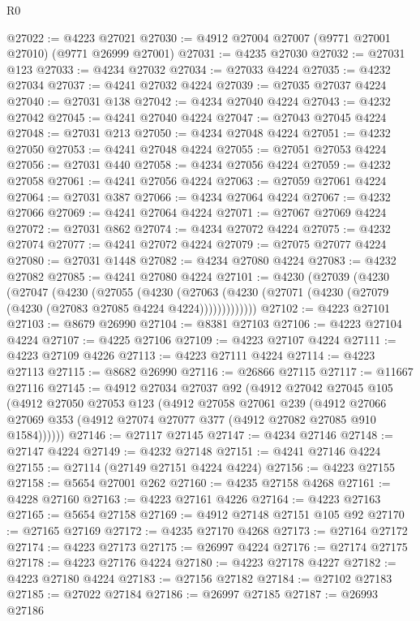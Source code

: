 \begin{lexlean}{R0}
\begin{coremodule}
@27022 := @4223 @27021
@27030 := @4912 @27004 @27007 (@9771 @27001 @27010) (@9771 @26999 @27001)
@27031 := @4235 @27030
@27032 := @27031 @123
@27033 := @4234 @27032
@27034 := @27033 @4224
@27035 := @4232 @27034
@27037 := @4241 @27032 @4224
@27039 := @27035 @27037 @4224
@27040 := @27031 @138
@27042 := @4234 @27040 @4224
@27043 := @4232 @27042
@27045 := @4241 @27040 @4224
@27047 := @27043 @27045 @4224
@27048 := @27031 @213
@27050 := @4234 @27048 @4224
@27051 := @4232 @27050
@27053 := @4241 @27048 @4224
@27055 := @27051 @27053 @4224
@27056 := @27031 @440
@27058 := @4234 @27056 @4224
@27059 := @4232 @27058
@27061 := @4241 @27056 @4224
@27063 := @27059 @27061 @4224
@27064 := @27031 @387
@27066 := @4234 @27064 @4224
@27067 := @4232 @27066
@27069 := @4241 @27064 @4224
@27071 := @27067 @27069 @4224
@27072 := @27031 @862
@27074 := @4234 @27072 @4224
@27075 := @4232 @27074
@27077 := @4241 @27072 @4224
@27079 := @27075 @27077 @4224
@27080 := @27031 @1448
@27082 := @4234 @27080 @4224
@27083 := @4232 @27082
@27085 := @4241 @27080 @4224
@27101 := @4230
    (@27039
      (@4230
        (@27047
          (@4230
            (@27055
              (@4230
                (@27063 (@4230 (@27071 (@4230 (@27079 (@4230 (@27083 @27085 @4224 @4224)))))))))))))
@27102 := @4223 @27101
@27103 := @8679 @26990
@27104 := @8381 @27103
@27106 := @4223 @27104 @4224
@27107 := @4225 @27106
@27109 := @4223 @27107 @4224
@27111 := @4223 @27109 @4226
@27113 := @4223 @27111 @4224
@27114 := @4223 @27113
@27115 := @8682 @26990
@27116 := @26866 @27115
@27117 := @11667 @27116
@27145 := @4912
    @27034
    @27037
    @92
    (@4912
      @27042
      @27045
      @105
      (@4912
        @27050
        @27053
        @123
        (@4912
          @27058
          @27061
          @239
          (@4912 @27066 @27069 @353 (@4912 @27074 @27077 @377 (@4912 @27082 @27085 @910 @1584))))))
@27146 := @27117 @27145
@27147 := @4234 @27146
@27148 := @27147 @4224
@27149 := @4232 @27148
@27151 := @4241 @27146 @4224
@27155 := @27114 (@27149 @27151 @4224 @4224)
@27156 := @4223 @27155
@27158 := @5654 @27001 @262
@27160 := @4235 @27158 @4268
@27161 := @4228 @27160
@27163 := @4223 @27161 @4226
@27164 := @4223 @27163
@27165 := @5654 @27158
@27169 := @4912 @27148 @27151 @105 @92
@27170 := @27165 @27169
@27172 := @4235 @27170 @4268
@27173 := @27164 @27172
@27174 := @4223 @27173
@27175 := @26997 @4224
@27176 := @27174 @27175
@27178 := @4223 @27176 @4224
@27180 := @4223 @27178 @4227
@27182 := @4223 @27180 @4224
@27183 := @27156 @27182
@27184 := @27102 @27183
@27185 := @27022 @27184
@27186 := @26997 @27185
@27187 := @26993 @27186

\end{coremodule}
\end{lexlean}

